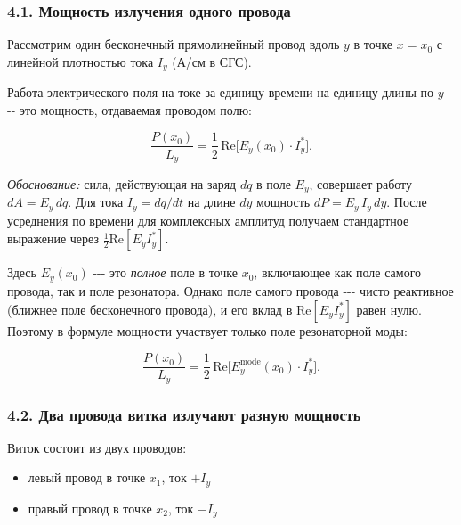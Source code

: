 \documentclass[11pt]{article}
\providecommand{\tightlist}{%
      \setlength{\itemsep}{0pt}\setlength{\parskip}{0pt}}
\begin{document}
\subsubsection{4.1. Мощность излучения одного
провода}\label{ux43cux43eux449ux43dux43eux441ux442ux44c-ux438ux437ux43bux443ux447ux435ux43dux438ux44f-ux43eux434ux43dux43eux433ux43e-ux43fux440ux43eux432ux43eux434ux430}

Рассмотрим один бесконечный прямолинейный провод вдоль \(y\) в точке
\(x = x_0\) с линейной плотностью тока \(I_y\) (А/см в СГС).

Работа электрического поля на токе за единицу времени на единицу длины
по \(y\) -\/-\/- это мощность, отдаваемая проводом полю:

\begin{equation*}
    \frac{P(x_0)}{L_y}
    = \frac{1}{2}\,\mathrm{Re}\bigl[E_y(x_0)\cdot I_y^*\bigr].
\end{equation*}

\emph{Обоснование:} сила, действующая на заряд \(dq\) в поле \(E_y\),
совершает работу \(dA = E_y\,dq\). Для тока \(I_y = dq/dt\) на длине
\(dy\) мощность \(dP = E_y\,I_y\,dy\). После усреднения по времени для
комплексных амплитуд получаем стандартное выражение через
\(\frac{1}{2}\mathrm{Re}[E_y I_y^*]\).

Здесь \(E_y(x_0)\) -\/-\/- это \emph{полное} поле в точке \(x_0\),
включающее как поле самого провода, так и поле резонатора. Однако поле
самого провода -\/-\/- чисто реактивное (ближнее поле бесконечного
провода), и его вклад в \(\mathrm{Re}[E_y I_y^*]\) равен нулю. Поэтому в
формуле мощности участвует только поле резонаторной моды:

\begin{equation*}
    \frac{P(x_0)}{L_y}
    = \frac{1}{2}\,\mathrm{Re}\bigl[E_y^{\mathrm{mode}}(x_0)\cdot I_y^*\bigr].
\end{equation*}

\subsubsection{4.2. Два провода витка излучают разную
мощность}\label{ux434ux432ux430-ux43fux440ux43eux432ux43eux434ux430-ux432ux438ux442ux43aux430-ux438ux437ux43bux443ux447ux430ux44eux442-ux440ux430ux437ux43dux443ux44e-ux43cux43eux449ux43dux43eux441ux442ux44c}

Виток состоит из двух проводов:

\begin{itemize}
\tightlist
\item
  левый провод в точке \(x_1\), ток \(+I_y\)
\item
  правый провод в точке \(x_2\), ток \(-I_y\)
\end{itemize}
\end{document}
